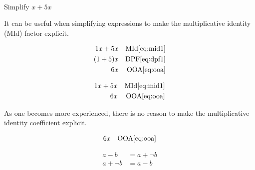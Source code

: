 \begin{example}[id:20141121-185558] \label{20141121-185558} \hfill \\

Simplify $x+5x$

\soln

\solnsteps

It can be useful when simplifying expressions to make the multiplicative identity (MId) factor explicit. 

\begin{align*}
1x+5x && \text{MId} \eqref{eq:mid1} \\
(1+5)x && \text{DPF} \eqref{eq:dpf1} \\
6x && \text{OOA} \eqref{eq:ooa} 
\end{align*}

\soln

\lesssteps
\begin{align*}
1x+5x && \text{MId} \eqref{eq:mid1} \\
6x && \text{OOA} \eqref{eq:ooa} 
\end{align*}

As one becomes more experienced, there is no reason to make the multiplicative identity coefficient explicit.

\soln

\lesssteps
\begin{align*}
6x && \text{OOA} \eqref{eq:ooa} 
\end{align*}

\end{example}


\begin{definition}
\begin{subequations}
\begin{align}
a-b &= a+\neg b \label{eq:dos1} \\
a+\neg b &= a-b \label{eq:dos2}
\end{align}
\end{subequations}
\end{definition}

